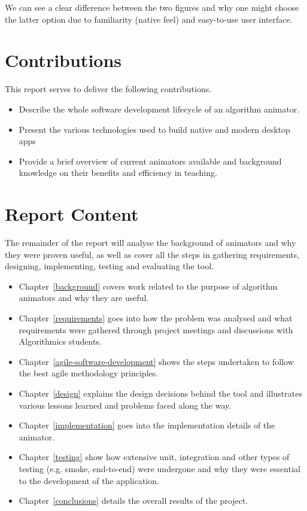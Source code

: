 \documentclass{l4proj}
\begin{document}
We can see a clear difference between the two figures and why one might choose the latter option due to familiarity (native feel) and easy-to-use user interface.

\section{Contributions}

This report serves to deliver the following contributions.

\begin{itemize}
	\item Describe the whole software development lifecycle of an algorithm animator.
	\item Present the various technologies used to build native and modern desktop apps~\cite{electron}~\cite{visjs}
	\item Provide a brief overview of current animators available and background knowledge on their benefits and efficiency in teaching.
\end{itemize}


\section{Report Content}
The remainder of the report will analyse the background of animators and why they were proven useful, as well as cover all the steps in gathering requirements, designing, implementing, testing and evaluating the tool.

\begin{itemize}
\item Chapter~\ref{background} covers work related to the purpose of algorithm animators and why they are useful.
\item Chapter~\ref{requirements} goes into how the problem was analysed and what requirements were gathered through
	project meetings and discussions with Algorithmics students.
\item Chapter~\ref{agile-software-development} shows the steps undertaken to follow the best agile methodology principles.
\item Chapter~\ref{design} explains the design decisions behind the tool and illustrates various lessons learned and
	problems faced along the way.
\item Chapter~\ref{implementation} goes into the implementation details of the animator.
\item Chapter~\ref{testing} show how extensive unit, integration and other types of testing (e.g. smoke, end-to-end)
	were undergone and why they were essential to the development of the application.
\item Chapter~\ref{conclusions} details the overall results of the project.
\end{itemize}
\end{document}
